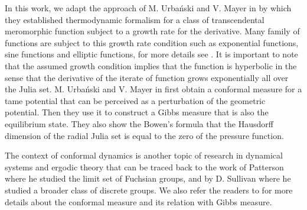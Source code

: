 \documentclass[12pt,reqno]{amsart}
\begin{document}
\noindent In this work, we adapt the approach of M. Urba\'{n}ski and V. Mayer in \cite{Urbanski-Mayer} by which they established thermodynamic formalism for a class of transcendental meromorphic function subject to a growth rate for the derivative. Many family of functions are subject to this growth rate condition such as exponential functions, sine functions and elliptic functions, for more details see  \cite[p. 7]{Urbanski-Mayer}. It is important to note that the assumed growth condition implies that the function is hyperbolic in the sense that the derivative of the iterate of function grows exponentially all over the Julia set.  M. Urba\'{n}ski and V. Mayer in \cite{Urbanski-Mayer} first obtain a conformal measure for a tame potential that can be perceived as a perturbation of the geometric potential. Then they use it to construct a Gibbs measure that is also the equilibrium state. They also show the Bowen's formula that the Hausdorff dimension of the radial Julia set is equal to the zero of the pressure function. 

\noindent The context of conformal dynamics is another topic of research in dynamical systems and ergodic theory that can be traced back to the work of Patterson \cite{Pattersonn} where he studied the limit set of Fuchsian groups, and by D. Sullivan \cite{Sullivan} where he studied a broader class of discrete groups. We also refer the readers to \cite{Stratmann} for more details about the conformal measure and its relation with Gibbs measure.
\end{document}
